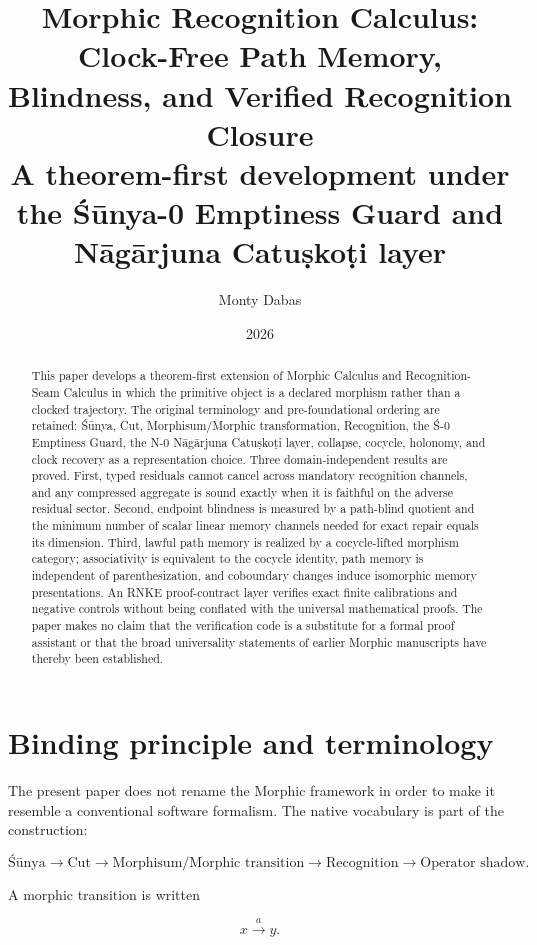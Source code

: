 \documentclass[11pt]{article}
\title{Morphic Recognition Calculus:\\Clock-Free Path Memory, Blindness, and Verified Recognition Closure\\[0.4em]
\large A theorem-first development under the Śūnya-0 Emptiness Guard and Nāgārjuna Catuṣkoṭi layer}
\author{Monty Dabas}
\date{2026}
\begin{document}
\maketitle

\begin{abstract}
This paper develops a theorem-first extension of Morphic Calculus and Recognition-Seam Calculus in which the primitive object is a declared morphism rather than a clocked trajectory. The original terminology and pre-foundational ordering are retained: Śūnya, Cut, Morphisum/Morphic transformation, Recognition, the Ś-0 Emptiness Guard, the N-0 Nāgārjuna Catuṣkoṭi layer, collapse, cocycle, holonomy, and clock recovery as a representation choice. Three domain-independent results are proved. First, typed residuals cannot cancel across mandatory recognition channels, and any compressed aggregate is sound exactly when it is faithful on the adverse residual sector. Second, endpoint blindness is measured by a path-blind quotient and the minimum number of scalar linear memory channels needed for exact repair equals its dimension. Third, lawful path memory is realized by a cocycle-lifted morphism category; associativity is equivalent to the cocycle identity, path memory is independent of parenthesization, and coboundary changes induce isomorphic memory presentations. An RNKE proof-contract layer verifies exact finite calibrations and negative controls without being conflated with the universal mathematical proofs. The paper makes no claim that the verification code is a substitute for a formal proof assistant or that the broad universality statements of earlier Morphic manuscripts have thereby been established.
\end{abstract}

\tableofcontents

\section{Binding principle and terminology}

The present paper does not rename the Morphic framework in order to make it resemble a conventional software formalism. The native vocabulary is part of the construction:

\[
\boxed{
\text{Śūnya}\to\text{Cut}\to\text{Morphisum/Morphic transition}\to\text{Recognition}\to\text{Operator shadow}.
}
\]

A morphic transition is written

\[
x\xrightarrow{a}y.
\]
\end{document}
